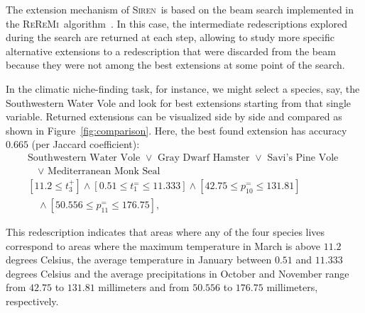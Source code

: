 \documentclass{llncs}
\newcommand{\Siren}{\textsc{Siren}}
\newcommand{\ReReMi}{\textsc{ReReMi}}
\begin{document}
The extension mechanism of \Siren\ is based on the beam search
implemented in the \ReReMi\ algorithm~\cite{galbrun11black}. In this case, the intermediate redescriptions
explored during the search are returned at each step, allowing to study
more specific alternative extensions to a redescription that were discarded from the beam
because they were not among the best extensions at some point of the search.

In the climatic niche-finding task, for instance, we might select a
species, say, the Southwestern Water Vole and look for best extensions
starting from that single variable.  Returned extensions can be
visualized side by side and compared as shown in
Figure~\ref{fig:comparison}. Here, the best found extension has
accuracy $0.665$ (per Jaccard coefficient):
\begin{equation*}
\begin{array}{l}
\text{Southwestern Water Vole }\lor\text{ Gray Dwarf Hamster }\lor\text{ Savi's Pine Vole }\\[1mm]
\quad\lor\text{ Mediterranean Monk Seal}\\[3mm]
[11.2 \leq t_{3}^{+}] \land  [0.51 \leq t_{1}^{=} \leq 11.333]\land  [42.75 \leq p_{10}^{=} \leq 131.81] \\[1mm]
\quad\land [50.556 \leq p_{11}^{=} \leq 176.75],
\end{array}
\end{equation*}

This redescription indicates that areas where any of the four
species lives correspond to areas where the maximum temperature in
March is above $11.2$ degrees Celsius, the average temperature in January
between $0.51$ and $11.333$ degrees Celsius and the average precipitations in
October and November range from $42.75$ to $131.81$ millimeters and from $50.556$ to $176.75$ millimeters, respectively.


\end{document}
